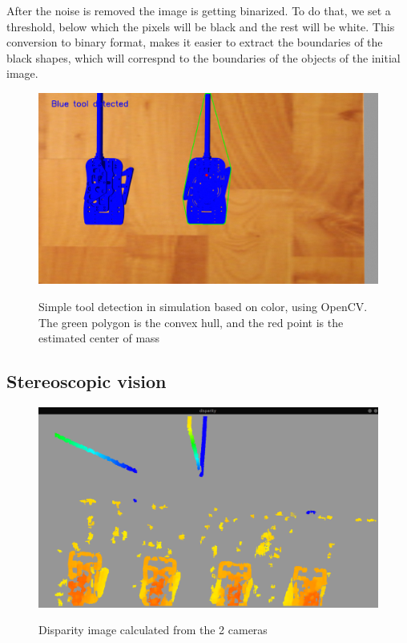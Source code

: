 After the noise is removed the image is getting binarized. To do that, we set a threshold, below which the pixels will be black and the rest will be white. This conversion to binary format, makes it 
easier to extract the boundaries of the black shapes, which will correspnd to the boundaries of the objects of the initial image.

\begin{center}
\begin{figure}[H]
\centering
\includegraphics[width=12cm]{images/opencv-tool-convex-hull.png}\\
\caption{Simple tool detection in simulation based on color, using OpenCV. The green polygon is the convex hull, and the red point is the
estimated center of mass}
\end{figure}
\end{center}

\subsection{Stereoscopic vision}

\begin{center}
\begin{figure}[H]
\centering
\includegraphics[width=12cm]{images/disparity.png}\\
\caption{Disparity image calculated from the 2 cameras}
\end{figure}
\end{center}

